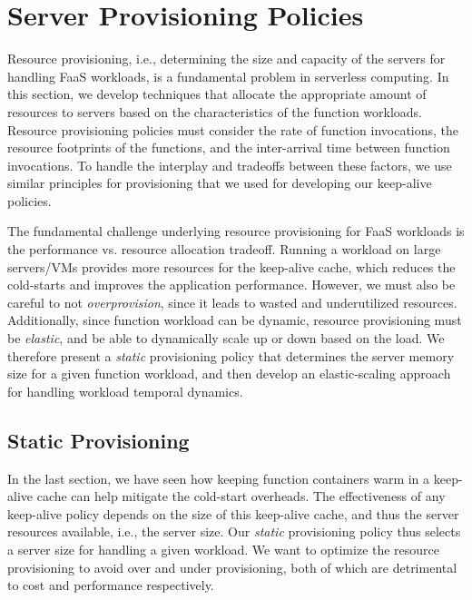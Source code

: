 \section{Server Provisioning Policies}
\label{sec:provision}
\vspace*{\subsecspace}

Resource provisioning, i.e., determining the size and capacity of the servers for handling FaaS workloads, is a fundamental problem in serverless computing. 
In this section, we develop techniques that allocate the appropriate amount of resources to servers based on the characteristics of the function workloads. 
Resource provisioning policies must consider the rate of function invocations, the resource footprints of the functions, and the inter-arrival time between function invocations. 
To handle the interplay and tradeoffs between these factors, we use similar principles for provisioning that we used for developing our keep-alive policies. 

The fundamental challenge underlying resource provisioning for FaaS workloads is the performance vs. resource allocation tradeoff. 
Running a workload on large servers/VMs provides more resources for the keep-alive cache, which reduces the cold-starts and improves the application performance. 
However, we must also be careful to not \emph{overprovision}, since it leads to wasted and underutilized resources.
Additionally, since function workload can be dynamic, resource provisioning must be \emph{elastic}, and be able to dynamically scale up or down based on the load. 
We therefore present a \emph{static} provisioning policy that determines the server memory size for a given function workload, and then develop an elastic-scaling approach for handling workload temporal dynamics. 

\subsection{Static Provisioning}
\label{subsec:static}
\vspace*{\subsecspace}

In the last section, we have seen how keeping function containers warm in a keep-alive cache can help mitigate the cold-start overheads. 
The effectiveness of any keep-alive policy depends on the size of this keep-alive cache, and thus the server resources available, i.e., the server size. 
Our \emph{static} provisioning policy thus selects a server size for handling a given workload. 
We want to optimize the resource provisioning to avoid over and under provisioning, both of which are detrimental to cost and performance respectively. 


